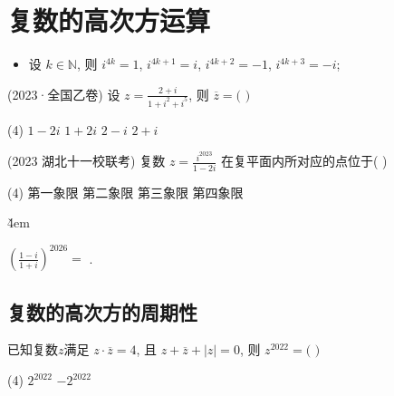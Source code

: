 \section{复数的高次方运算}

\begin{theorem}[复数的高次方运算]
    \begin{itemize}
        \item 设 $k\in \mathbb{N}$, 则 $i^{4k}=1$, $i^{4k+1}=i$, $i^{4k+2}=-1$, $i^{4k+3}=-i$;
    \end{itemize}
\end{theorem}

\begin{example}(2023·全国乙卷)
    设 $z=\frac{2+i}{1+i^{2}+i^{5}}$, 则 $\overline{z}=($ \quad $)$
    \begin{tasks}(4)
        \task $1-2i$
        \task $1+2i$
        \task $2-i$
        \task $2+i$
    \end{tasks}
\end{example}

\vspace{4em}

\begin{example}(2023 湖北十一校联考)
    复数 $z=\frac{i^{2023}}{1-2i}$ 在复平面内所对应的点位于( \quad )
    \begin{tasks}(4)
        \task 第一象限
        \task 第二象限
        \task 第三象限
        \task 第四象限
    \end{tasks}
\end{example}

\v{4em}

\begin{example}
    $\left(\frac{1-i}{1+i}\right)^{2026}=$ \underline{\qquad}.
\end{example}

\subsection{复数的高次方的周期性}

\begin{example}
    已知复数$z$满足 $z\cdot\overline{z}=4$, 且 $z+\overline{z}+|z|=0$, 则 $z^{2022}=($ \quad $)$
    \begin{tasks}(4)
        \task $2^{2022}$
        \task $-2^{2022}$
    \end{tasks}
\end{example}

